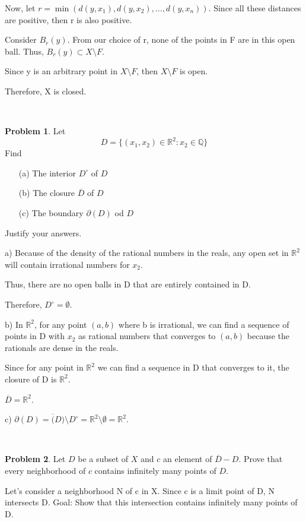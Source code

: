 \documentclass[12]{amsart}
\theoremstyle{definition}
\newtheorem{xca}{Problem}
\newcommand{\R}{\mathbb{R}}
\newcommand{\cl}{\overline}
\newcommand{\lskip}{\newpage}
\begin{document}
Now, let $r = \min(d(y, x_1), d(y, x_2), \dots, d(y, x_n))$.
Since all these distances are positive, then r is also positive.

Consider $B_r(y)$. From our choice of r, none of the points in F are in
this open ball. Thus, $B_r(y) \subset X \setminus F$.

Since y is an arbitrary point in $X \setminus F$, then $X \setminus F$ is open.

Therefore, X is closed.


\lskip

\
\begin{xca}
Let $$D=\{(x_1,x_2)\in \R^2:  x_2\in \mathbb{Q}\}$$
Find
\begin{itemize}
\item [(a)] The interior $D^\circ$ of $D$
\smallskip
\item [(b)] The closure $\cl{D}$ of $D$
\smallskip
\item [(c)] The boundary $\partial(D)$ od $D$
\end{itemize}
\smallskip
Justify your answers.
\end{xca}

a) Because of the density of the rational numbers in the reals, any open set
in $\R^2$ will contain irrational numbers for $x_2$.

Thus, there are no open balls in D that are entirely contained in D.

Therefore, $D^\circ = \emptyset$.

b) In $\R^2$, for any point $(a, b)$ where b is irrational, we can find a sequence
of points in D with $x_2$ as rational numbers that converges to $(a, b)$
because the rationals are dense in the reals.

Since for any point in $\R^2$ we can find a sequence in D that converges to it,
the closure of D is $\R^2$.

$\cl{D} = \R^2$.

c) $\partial(D) = \cl(D) \setminus D^\circ = \R^2 \setminus \emptyset = \R^2$.


\lskip


\
\begin{xca}

Let $D$ be a subset of $X$ and $c$ an element of $\cl{D}-D$. Prove that every neighborhood of $c$ contains infinitely many points of $D$.
\end{xca}

Let's consider a neighborhood N of c in X. Since c is a limit point of D,
N intersects D. Goal: Show that this intersection contains infinitely many points of D.
\end{document}
